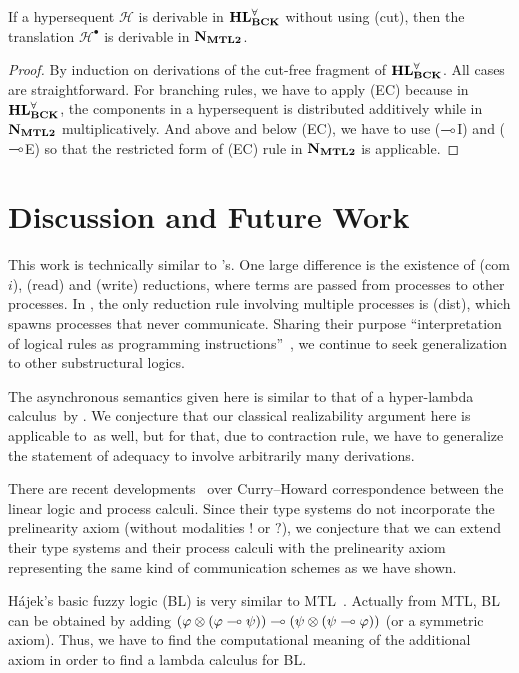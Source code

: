 \begin{proposition}[Completeness]
 \label{prop:comp}
 If a hypersequent $\mathcal H$ is
 derivable in $\mathbf{HL}^\forall_{\mathbf{BCK}}$ without using (cut), then the translation $\mathcal H^\bullet$ is
 derivable in $\mathbf{N}_{\mathbf{MTL2}}$.
\end{proposition}
\begin{proof}
 By induction on derivations of the cut-free fragment of $\mathbf{HL}^\forall_{\mathbf{BCK}}$.
 All cases are straightforward.  For branching rules, we have to apply
 (EC) because in $\mathbf{HL}^\forall_{\mathbf{BCK}}$, the components in a hypersequent is distributed
 additively while in $\mathbf{N}_{\mathbf{MTL2}}$ multiplicatively.  And above and below
 (EC), we have to use ($\multimap$I) and ($\multimap$E) so that the
 restricted form of (EC) rule in $\mathbf{N}_{\mathbf{MTL2}}$ is applicable.
\end{proof}

\section{Discussion and Future Work}
\label{sec:discuss}
This work is technically similar to \citet{danos-krivine}'s.
One large difference is the existence of (com$i$), (read) and (write)
reductions, where terms are passed from processes to other
processes.
In \citep{danos-krivine}, the only reduction rule involving multiple
processes is (dist), which spawns processes that never communicate.
Sharing their purpose
``interpretation of logical rules as programming
instructions''~\citep{danos-krivine},
we continue to seek generalization to other substructural
logics.

The asynchronous semantics given here is similar to that of a
hyper-lambda calculus \lgd\,by
\citet{hiraiflops2012}.
We conjecture that our classical realizability argument here is
applicable to \lgd\,as well, but for that, due to contraction rule,
we have to generalize the statement of adequacy to involve arbitrarily
many derivations.

There are recent
developments~\citep{pfenning2010,wadler2012propositions} over
Curry--Howard correspondence between
the linear logic and process
calculi.
Since their type systems do not incorporate the prelinearity axiom
(without modalities $!$ or $?$),
we conjecture that we can extend their type systems and their process
calculi
with the prelinearity
axiom representing the same kind of communication schemes as we have
shown.

H\'{a}jek's basic fuzzy logic (BL) is very similar to
MTL~\citep{chvalovsky2012}.
Actually from MTL, BL can be obtained by adding
$(\varphi\otimes(\varphi\multimap\psi)) \multimap (\psi\otimes(\psi\multimap\varphi))$ (or a
symmetric axiom).  Thus, we have to find the computational meaning of
the additional axiom in order to find a lambda calculus for BL.

